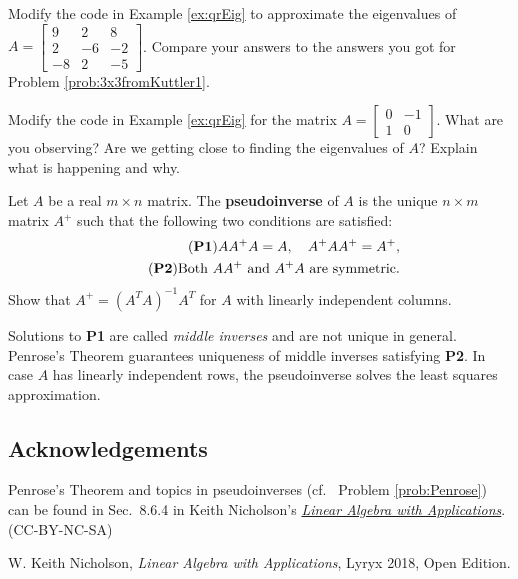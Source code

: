 \documentclass{ximera}
\begin{document}
\begin{problem}\label{prob_oct_qr1}
Modify the code in Example \ref{ex:qrEig} to approximate the eigenvalues of $A=\begin{bmatrix} 9 & 2 & 8\\ 2 & -6 & -2\\ -8 & 2 & -5\end{bmatrix}$.  Compare your answers to the answers you got for Problem \ref{prob:3x3fromKuttler1}.
\end{problem}
 
\begin{problem}\label{prob_oct_qr2}
  Modify the code in Example \ref{ex:qrEig} for the matrix $A=\begin{bmatrix} 0 & -1\\ 1 & 0 \end{bmatrix}$.  What are you observing?  Are we getting close to finding the eigenvalues of $A$?  Explain what is happening and why.
  \end{problem}


\begin{problem}\label{prob:Penrose}
Let $A$ be a real $m\times n$ matrix. The {\bf pseudoinverse} of $A$ is the unique $n\times m$ matrix $A^+$ such that the following two conditions are satisfied:
\begin{align}
    \tag{{\bf P1}} \label{eq:P1}
    AA^+A = A, \quad A^+AA^+ = A^+, \\
    \tag{{\bf P2}} \label{eq:P2}
    \text{Both $AA^+$ and $A^+A$ are symmetric.}
\end{align}
Show that $A^+ = (A^TA)^{-1}A^T$ for $A$ with linearly independent columns.
\end{problem}

\begin{remark}\label{rk:Penrose}
    Solutions to {\bf P1} are called \emph{middle inverses} and are not unique in general. Penrose's Theorem guarantees uniqueness of middle inverses satisfying {\bf P2}. In case $A$ has linearly independent rows, the pseudoinverse solves the least squares approximation.
\end{remark}

\subsection*{Acknowledgements}
 
Penrose's Theorem and topics in pseudoinverses (cf.~ Problem \ref{prob:Penrose}) can be found in Sec.~8.6.4 in Keith Nicholson's \href{https://open.umn.edu/opentextbooks/textbooks/linear-algebra-with-applications}{\it Linear Algebra with Applications}. (CC-BY-NC-SA)
 
W. Keith Nicholson, {\it Linear Algebra with Applications}, Lyryx 2018, Open Edition.
\end{document}
